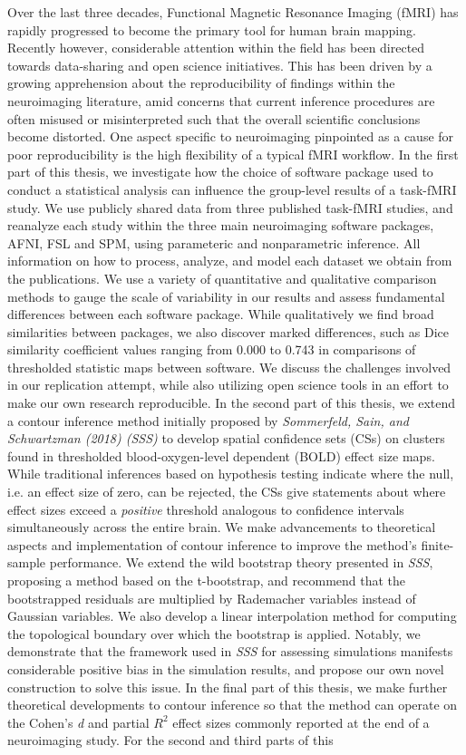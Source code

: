 \documentclass[11pt,a4paper]{report}      %
\begin{document}
\begin{thesisabstract}
\begin{singlespace}
Over the last three decades, Functional Magnetic Resonance Imaging (fMRI) has rapidly progressed to become the primary tool for human brain mapping. Recently however, considerable attention within the field has been directed towards data-sharing and open science initiatives. This has been driven by a growing apprehension about the reproducibility of findings within the neuroimaging literature, amid concerns that current inference procedures are often misused or misinterpreted such that the overall scientific conclusions become distorted. One aspect specific to neuroimaging pinpointed as a cause for poor reproducibility is the high flexibility of a typical fMRI workflow. In the first part of this thesis, we investigate how the choice of software package used to conduct a statistical analysis can influence the group-level results of a task-fMRI study. We use publicly shared data from three published task-fMRI studies, and reanalyze each study within the three main neuroimaging software packages, AFNI, FSL and SPM, using parameteric and nonparametric inference. All information on how to process, analyze, and model each dataset we obtain from the publications. We use a variety of quantitative and qualitative comparison methods to gauge the scale of variability in our results and assess fundamental differences between each software package. While qualitatively we find broad similarities between packages, we also discover marked differences, such as Dice similarity coefficient values ranging from 0.000 to 0.743 in comparisons of thresholded statistic maps between software. We discuss the challenges involved in our replication attempt, while also utilizing open science tools in an effort to make our own research reproducible. In the second part of this thesis, we extend a contour inference method initially proposed by \textit{Sommerfeld, Sain, and Schwartzman (2018) (SSS)} to develop spatial confidence sets (CSs) on clusters found in thresholded blood-oxygen-level dependent (BOLD) effect size maps. While traditional inferences based on hypothesis testing indicate where the null, i.e. an effect size of zero, can be rejected, the CSs give statements about where effect sizes exceed a \textit{positive} threshold analogous to confidence intervals simultaneously across the entire brain. We make advancements to theoretical aspects and implementation of contour inference to improve the method's finite-sample performance. We extend the wild bootstrap theory presented in \textit{SSS}, proposing a method based on the t-bootstrap, and recommend that the bootstrapped residuals are multiplied by Rademacher variables instead of Gaussian variables. We also develop a linear interpolation method for computing the topological boundary over which the bootstrap is applied. Notably, we demonstrate that the framework used in \textit{SSS} for assessing simulations manifests considerable positive bias in the simulation results, and propose our own novel construction to solve this issue. In the final part of this thesis, we make further theoretical developments to contour inference so that the method can operate on the Cohen's \textit{d} and partial $R^{2}$ effect sizes commonly reported at the end of a neuroimaging study. For the second and third parts of this 
\end{singlespace}
\end{thesisabstract}
\end{document}
